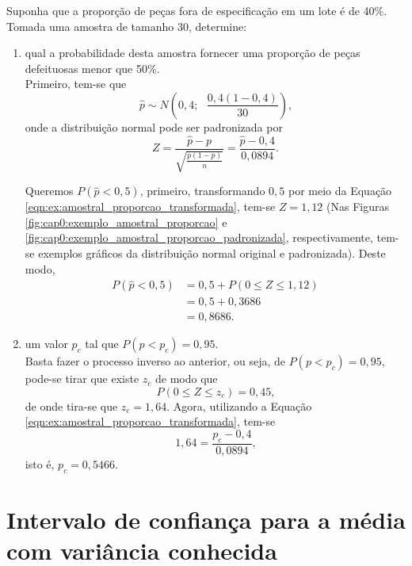 \documentclass[11pt,fleqn]{book}
\numberwithin{mpicture}{chapter}
\numberwithin{mtable}{chapter}
\numberwithin{mframe}{chapter}
\begin{document}
\begin{example}
	Suponha que a proporção de peças fora de especificação em um lote é de 40\%. Tomada uma amostra de tamanho 30, determine:
	
	\begin{enumerate}[label=(\alph*)]
		\item qual a probabilidade desta amostra fornecer uma proporção de peças defeituosas menor que 50\%.\\
		
			Primeiro, tem-se que
			\[
				\hat{p}\sim N\left ( 0,4;\text{ }\frac{0,4(1-0,4)}{30}\right )
				\text{,}
			\]
			onde a distribuição normal pode ser padronizada por
			\begin{equation}
				\label{eqn:ex:amostral_proporcao_transformada}
				Z=\frac{\hat{p}-p}{\sqrt{\frac{p(1-p)}{n}}}
				 =\frac{\hat{p}-0,4}{0,0894}
				\text{.}
			\end{equation}
			
			Queremos $P(\hat{p}<0,5)$, primeiro, transformando $0,5$ por meio da Equação \ref{eqn:ex:amostral_proporcao_transformada}, tem-se $Z=1,12$ (Nas Figuras \ref{fig:cap0:exemplo_amostral_proporcao} e \ref{fig:cap0:exemplo_amostral_proporcao_padronizada}, respectivamente, tem-se exemplos gráficos da distribuição normal original e padronizada). Deste modo,
			\begin{align*}
				P(\hat{p}<0,5) &=0,5+P(0\leqslant Z\leqslant 1,12)\\
								&=0,5+0,3686\\
								&=0,8686\text{.}
			\end{align*}
			
		\item um valor $p_c$ tal que $P(p<p_c)=0,95$.\\
		
			Basta fazer o processo inverso ao anterior, ou seja, de $P(p<p_c)=0,95$, pode-se tirar que existe $z_c$ de modo que
			\[
				P(0\leqslant Z\leqslant z_c)=0,45\text{,}
			\]
			de onde tira-se que $z_c=1,64$. Agora, utilizando a Equação \ref{eqn:ex:amostral_proporcao_transformada}, tem-se
			\[
				1,64=\frac{p_c-0,4}{0,0894}\text{,}
			\]
			isto é, $p_c=0,5466$.
	\end{enumerate}
\end{example}

\section{Intervalo de confiança para a média com variância conhecida}
\end{document}

